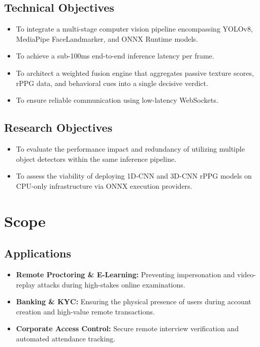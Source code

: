 \documentclass[12pt, a4paper]{report}
\begin{document}
\section{Technical Objectives}
\begin{itemize}
    \item To integrate a multi-stage computer vision pipeline encompassing YOLOv8, MediaPipe FaceLandmarker, and ONNX Runtime models.
    \item To achieve a sub-100ms end-to-end inference latency per frame.
    \item To architect a weighted fusion engine that aggregates passive texture scores, rPPG data, and behavioral cues into a single decisive verdict.
    \item To ensure reliable communication using low-latency WebSockets.
\end{itemize}

\section{Research Objectives}
\begin{itemize}
    \item To evaluate the performance impact and redundancy of utilizing multiple object detectors within the same inference pipeline.
    \item To assess the viability of deploying 1D-CNN and 3D-CNN rPPG models on CPU-only infrastructure via ONNX execution providers.
\end{itemize}

\chapter{Scope}

\section{Applications}
\begin{itemize}
    \item \textbf{Remote Proctoring \& E-Learning:} Preventing impersonation and video-replay attacks during high-stakes online examinations.
    \item \textbf{Banking \& KYC:} Ensuring the physical presence of users during account creation and high-value remote transactions.
    \item \textbf{Corporate Access Control:} Secure remote interview verification and automated attendance tracking.
\end{itemize}
\end{document}
